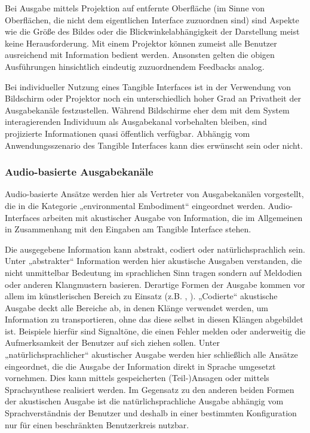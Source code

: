Bei Ausgabe mittels Projektion auf entfernte Oberfläche (im Sinne von Oberflächen, die nicht dem eigentlichen Interface zuzuordnen sind) sind Aspekte wie die Größe des Bildes oder die Blickwinkelabhängigkeit der Darstellung meist keine Herausforderung. Mit einem Projektor können zumeist alle Benutzer ausreichend mit Information bedient werden. Ansonsten gelten die obigen Ausführungen hinsichtlich eindeutig zuzuordnendem Feedbacks analog.

Bei individueller Nutzung eines Tangible Interfaces ist in der Verwendung von Bildschirm oder Projektor noch ein unterschiedlich hoher Grad an Privatheit der Ausgabekanäle festzustellen. Während Bildschirme eher dem mit dem System interagierenden Individuum als Ausgabekanal vorbehalten bleiben, sind projizierte Informationen quasi öffentlich verfügbar. Abhängig vom Anwendungsszenario des Tangible Interfaces kann dies erwünscht sein oder nicht.


\subsubsection{Audio-basierte Ausgabekanäle} %
\label{ssub:audioausgabe}

Audio-basierte Ansätze werden hier als Vertreter von Ausgabekanälen vorgestellt, die in die Kategorie „environmental Embodiment“ eingeordnet werden. Audio-Interfaces arbeiten mit akustischer Ausgabe von Information, die im Allgemeinen in Zusammenhang mit den Eingaben am Tangible Interface stehen. 

Die ausgegebene Information kann abstrakt, codiert oder natürlichsprachlich sein. Unter „abstrakter“ Information werden hier akustische Ausgaben verstanden, die nicht unmittelbar Bedeutung im sprachlichen Sinn tragen sondern auf Meldodien oder anderen Klangmustern basieren. Derartige Formen der Ausgabe kommen vor allem im künstlerischen Bereich zu Einsatz (z.B. \citep{Kaltenbrunner06}, \citep{Pedersen09}). „Codierte“ akustische Ausgabe deckt alle Bereiche ab, in denen Klänge verwendet werden, um Information zu transportieren, ohne das diese selbst in diesen Klängen abgebildet ist. Beispiele hierfür sind Signaltöne, die einen Fehler melden oder anderweitig die Aufmerksamkeit der Benutzer auf sich ziehen sollen. Unter „natürlichsprachlicher“ akustischer Ausgabe werden hier schließlich alle Ansätze eingeordnet, die die Ausgabe der Information direkt in Sprache umgesetzt vornehmen. Dies kann mittels gespeicherten (Teil-)Ansagen oder mittels Sprachsynthese realisiert werden. Im Gegensatz zu den anderen beiden Formen der akustischen Ausgabe ist die natürlichsprachliche Ausgabe abhängig vom Sprachverständnis der Benutzer und deshalb in einer bestimmten Konfiguration nur für einen beschränkten Benutzerkreis nutzbar.

